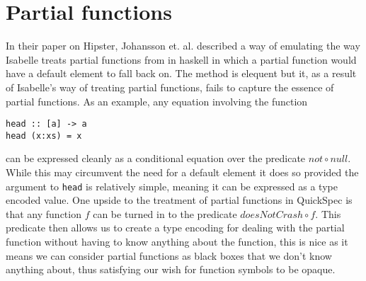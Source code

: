 \section{Partial functions}
In their paper on Hipster, Johansson et. al. \cite{Johansson2014}
described a way of emulating the way Isabelle treats partial
functions from in haskell in which a partial function would
have a default element to fall back on. The method is
elequent but it, as a result of Isabelle's
way of treating partial functions,
fails to capture the essence of partial functions.
As an example, any equation involving the function
\begin{verbatim}head :: [a] -> a
head (x:xs) = x
\end{verbatim}
can be expressed cleanly as a conditional equation
over the predicate $not\circ null$.
While this may circumvent the need for
a default element it does so provided the
argument to \texttt{head} is relatively simple,
meaning it can be expressed as a type encoded value.
One upside to the treatment of partial functions in QuickSpec
is that any function $f$ can be turned in to the predicate
$doesNotCrash \circ f$. This predicate then allows us to create
a type encoding for dealing with the partial function without
having to know anything about the function, this is nice as it means
we can consider partial functions as black boxes that we don't know
anything about, thus satisfying our wish for function symbols to be opaque.
